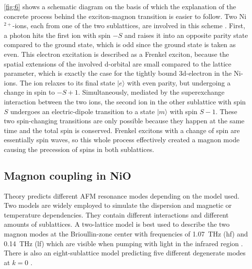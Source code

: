 \FloatBarrier
\autoref{fig:6} shows a schematic diagram on the basis of which the explanation of the concrete process behind the exciton-magnon transition is easier to follow.
Two Ni$^{2+}$-ions, each from one of the two sublattices, are involved in this scheme \cite{bossini_ultrafast_2021}.
First, a photon hits the first ion with spin $-S$ and raises it into an opposite parity state compared to the ground state, which is odd since the ground state is taken as even.
This electron excitation is described as a Frenkel exciton, because the spatial extensions of the involved d-orbital are small compared to the lattice parameter, which is exactly the case for the tightly bound 3d-electron in the Ni-ions.
The ion relaxes to its final state $|e\rangle$ with even parity, but undergoing a change in spin to $-S+1$.
Simultaneously, mediated by the superexchange interaction between the two ions, the second ion in the other sublattice with spin $S$ undergoes an electric-dipole transition to a state $|m\rangle$ with spin $S-1$.
These two spin-changing transitions are only possible because they happen at the same time and the total spin is conserved.
Frenkel excitons with a change of spin are essentially spin waves, so this whole process effectively created a magnon mode causing the precession of spins in both sublattices.

\subsection{Magnon coupling in NiO}
\label{sec:mode_coupling}
Theory predicts different AFM resonance modes depending on the model used.
Two models are widely employed to simulate the dispersion and magnetic or temperature dependencies.
They contain different interactions and different amounts of sublattices.
A two-lattice model is best used to describe the two magnon modes at the Brioullin-zone center with frequencies of \qty{1.07}{THz} (hf) and \qty{0.14}{THz} (lf) \cite{rezende_introduction_2019} which are visible when pumping with light in the infrared region \cite{tzschaschel_ultrafast_2017}.
There is also an eight-sublattice model predicting five different degenerate modes at $k=0$ \cite{milano_magnetic_2010}\cite{milano_effect_2004}.


